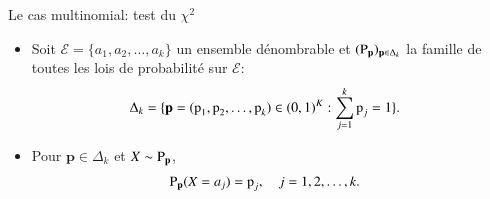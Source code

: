 \begin{frame}
    [allowframebreaks]{Le cas multinomial: test du $\chi^2$}
    \begin{itemize}
        \item Soit $\mathcal{E} = \{a_1, a_2, \ldots, a_k\}$ un ensemble dénombrable et 
        $(\operatorname{P}_{\mathbf{p}})_{\mathbf{p}\in\Delta_k}$ la famille de toutes les lois de probabilité sur $\mathcal{E}$: 
        \begin{align*}
            \Delta_k &=\{\mathbf{p} = (\operatorname{p}_1, \operatorname{p}_2, \ldots, \operatorname{p}_k)\in(0, 1)^K: 
            \sum_{j=1}^k\operatorname{p}_j = 1\}.
        \end{align*}
        \item Pour $\mathbf{p}\in\Delta_k$ et $X\sim \operatorname{P}_{\mathbf{p}}$,
        \begin{align*}
            \operatorname{P}_{\mathbf{p}}(X=a_j) &= \operatorname{p}_j, \quad j = 1,2, \ldots, k.
        \end{align*}

        \framebreak
        

\end{itemize}
\end{frame}
